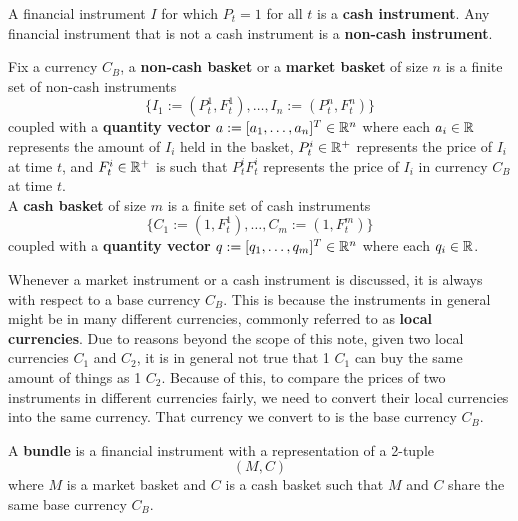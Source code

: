 \documentclass[11pt,fleqn]{book} %
\begin{document}
\begin{definition} \label{def:113}
A financial instrument \(I\) for which \(P_t = 1\) for all \(t\) is a \textbf{cash instrument}. Any financial
instrument that is not a cash instrument is a \textbf{non-cash instrument}.
\end{definition}

\begin{definition} \label{def:114}
Fix a currency \(C_B\), a \textbf{non-cash basket} or a \textbf{market basket} of size \(n\) is a finite set of non-cash instruments
\[
\{I_1 := (P^1_t, F^1_t), \ldots, I_n := (P_t^n, F_t^n)\}
\]
coupled with a \textbf{quantity vector} \(a := [a_1, \ldots, a_n]^T \in \mathbb{R}^n\) where each \(a_i \in \mathbb{R}\) represents the amount of 
\(I_i\) held in the basket, \(P_t^i \in \mathbb{R}^+\) represents the price of \(I_i\) at time \(t\), and \(F_t^i \in \mathbb{R}^+\) is 
such that \(P_t^iF_t^i\) represents the price of \(I_i\) in currency \(C_B\) at time \(t\).\\
A \textbf{cash basket} of size \(m\) is a finite set of cash instruments
\[
\{C_1 := (1, F_t^1), \ldots, C_m := (1, F_t^m)\}
\]
coupled with a \textbf{quantity vector} \(q := [q_1, \ldots, q_m]^T \in \mathbb{R}^n\) where each \(q_i \in \mathbb{R}\). 
\end{definition}

\begin{remark} \label{rmk:115}
Whenever a market instrument or a cash instrument is discussed, it is always with respect to a base currency \(C_B\). This is because the instruments in general might
be in many different currencies, commonly referred to as \textbf{local currencies}. Due to reasons beyond the scope of this note, given two local currencies \(C_1\) 
and \(C_2\), it is in general not true that 1 \(C_1\) can buy the same amount of things as 1 \(C_2\). Because of this, to compare the prices of two instruments in different
currencies fairly, we need to convert their local currencies into the same currency. That currency we convert to is the base currency \(C_B\).
\end{remark}

\begin{definition} \label{def:116}
A \textbf{bundle} is a financial instrument with a representation of a 2-tuple
\[
(M, C)
\]
where \(M\) is a market basket and \(C\) is a cash basket such that \(M\) and \(C\) share the same base currency \(C_B\).
\end{definition}
\end{document}
